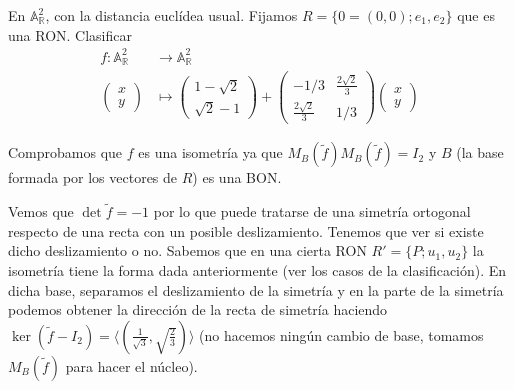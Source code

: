 \documentclass[14pt]{book}
\begin{document}
\begin{ej}
	En $\mathbb{A}_\mathbb{R}^2$, con la distancia euclídea usual. Fijamos $R = \{0 = (0,0); e_1, e_2\}$ que es una RON. Clasificar
	\begin{align*}
		f : \mathbb{A}_\mathbb{R}^2& \to \mathbb{A}_\mathbb{R}^2 \\
		\left(\begin{array}{c}
		x \\ y
		\end{array}\right) &\mapsto
		\left(\begin{array}{c}
		1 - \sqrt{2} \\ \sqrt{2} - 1
		\end{array}\right) + \left(\begin{array}{cc}
		-1/3 & \frac{2\sqrt{2}}{3} \\
		\frac{2\sqrt{2}}{3} & 1/3
		\end{array}\right)\left(\begin{array}{c}
		x \\ y
		\end{array}\right)
	\end{align*}
	
	Comprobamos que $f$ es una isometría ya que $M_B(\tilde{f}) M_B(\tilde{f}) = I_2$ y $B$ (la base formada por los vectores de $R$) es una BON.
	
	Vemos que $\det \tilde{f} = -1$ por lo que puede tratarse de una simetría ortogonal respecto de una recta con un posible deslizamiento. Tenemos que ver si existe dicho deslizamiento o no. Sabemos que en una cierta RON $R' = \{P; u_1, u_2\}$ la isometría tiene la forma dada anteriormente (ver los casos de la clasificación). En dicha base, separamos el deslizamiento de la simetría y en la parte de la simetría podemos obtener la dirección de la recta de simetría haciendo $\ker (\tilde{f} - I_2) = \langle (\frac{1}{\sqrt{3}}, \sqrt{\frac{2}{3}})\rangle$ (no hacemos ningún cambio de base, tomamos $M_B(\tilde{f})$ para hacer el núcleo).
	

\end{ej}
\end{document}
